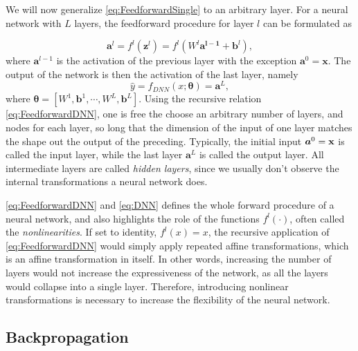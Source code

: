 We will now generalize \cref{eq:FeedforwardSingle} to an arbitrary layer. For a neural network with $L$ layers, the feedforward procedure for layer $l$ can be formulated as 

\begin{equation}\label{eq:FeedforwardDNN}
    \boldsymbol{a}^l = f^l(\boldsymbol{z}^l) = f^l(W^l \boldsymbol{a^{l-1}} + \boldsymbol{b}^l),
\end{equation}
where $\boldsymbol{a}^{l-1}$ is the activation of the previous layer with the exception $\boldsymbol{a}^{0} = \boldsymbol{x}$. The output of the network is then the activation of the last layer, namely 
\begin{equation}\label{eq:DNN}
    \hat{y} = f_{DNN}(x;\boldsymbol{\theta}) = \boldsymbol{a}^{L},
\end{equation}
where $\boldsymbol{\theta} = [W^1, \boldsymbol{b}^1, \cdots, W^L,  \boldsymbol{b}^L]$. Using the recursive relation \cref{eq:FeedforwardDNN}, one is free the choose an arbitrary number of layers, and nodes for each layer, so long that the dimension of the input of one layer matches the shape out the output of the preceding. Typically, the initial input $\boldsymbol{a}^0 = \bold{x}$ is called the input layer, while the last layer $\boldsymbol{a}^L$ is called the output layer. All intermediate layers are called \emph{hidden layers}, since we usually don't observe the internal transformations a neural network does.

\cref{eq:FeedforwardDNN} and \cref{eq:DNN} defines the whole forward procedure of a neural network, and also highlights the role of the functions $f^l(\cdot)$, often called the \emph{nonlinearities}. If set to identity, $f^l(x) = x$, the recursive application of \cref{eq:FeedforwardDNN} would simply apply repeated affine transformations, which is an affine transformation in itself. In other words, increasing the number of layers would not increase the expressiveness of the network, as all the layers would collapse into a single layer. Therefore, introducing nonlinear transformations is necessary to increase the flexibility of the neural network. 

\subsection{Backpropagation}\label{sec:BackpropogationDNN}


